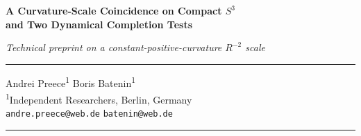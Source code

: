 \documentclass[11pt,a4paper]{article}
\begin{document}
\begin{titlepage}
\begin{center}
\vspace*{0.7cm}
{\fontsize{18}{22}\bfseries\color{resultcol}
  A Curvature-Scale Coincidence on Compact $S^3$}\\[0.5em]
{\fontsize{15}{19}\bfseries
  and Two Dynamical Completion Tests}

\vspace{0.6cm}
{\large\itshape\color{gray}
  Technical preprint on a constant-positive-curvature $R^{-2}$ scale}

\vspace{0.8cm}
\rule{0.85\textwidth}{1.2pt}

\vspace{0.4cm}
{\large Andrei Preece\textsuperscript{1} \quad Boris Batenin\textsuperscript{1}}\\[0.3em]
{\normalsize\textsuperscript{1}Independent Researchers, Berlin, Germany}\\[0.15em]
{\small\texttt{andre.preece@web.de} \quad \texttt{batenin@web.de}}

\vspace{0.4cm}
\rule{0.85\textwidth}{1.2pt}


\end{center}
\end{titlepage}
\end{document}
